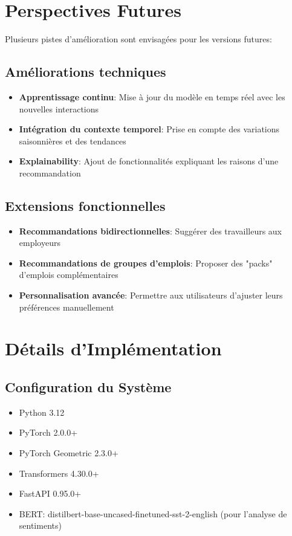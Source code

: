 \documentclass[12pt,a4paper]{article}
\begin{document}
\section{Perspectives Futures}

Plusieurs pistes d'amélioration sont envisagées pour les versions futures:

\subsection{Améliorations techniques}
\begin{itemize}
    \item \textbf{Apprentissage continu}: Mise à jour du modèle en temps réel avec les nouvelles interactions
    \item \textbf{Intégration du contexte temporel}: Prise en compte des variations saisonnières et des tendances
    \item \textbf{Explainability}: Ajout de fonctionnalités expliquant les raisons d'une recommandation
\end{itemize}

\subsection{Extensions fonctionnelles}
\begin{itemize}
    \item \textbf{Recommandations bidirectionnelles}: Suggérer des travailleurs aux employeurs
    \item \textbf{Recommandations de groupes d'emplois}: Proposer des "packs" d'emplois complémentaires
    \item \textbf{Personnalisation avancée}: Permettre aux utilisateurs d'ajuster leurs préférences manuellement
\end{itemize}

\appendix
\section{Détails d'Implémentation}
\subsection{Configuration du Système}
\begin{itemize}
    \item Python 3.12
    \item PyTorch 2.0.0+
    \item PyTorch Geometric 2.3.0+
    \item Transformers 4.30.0+
    \item FastAPI 0.95.0+
    \item BERT: distilbert-base-uncased-finetuned-sst-2-english (pour l'analyse de sentiments)
\end{itemize}
\end{document}
